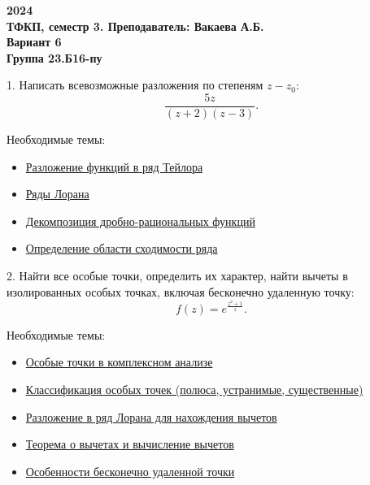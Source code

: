 \documentclass[a4paper,12pt]{article}
\begin{document}
\begin{center}
    \textbf{2024}\\
    \textbf{ТФКП, семестр 3. Преподаватель: Вакаева А.Б.}\\
    \vspace{1cm}
    \textbf{Вариант 6}\\
    \textbf{Группа 23.Б16-пу}
\end{center}

\vspace{1cm}

1. Написать всевозможные разложения по степеням $z - z_0$:
\begin{equation*}
    \frac{5z}{(z+2)(z-3)}.
\end{equation*}

Необходимые темы:
\begin{itemize}
    \item \href{https://ru.wikipedia.org/wiki/Ряд_Тейлора}{Разложение функций в ряд Тейлора}
    \item \href{https://ru.wikipedia.org/wiki/Ряд_Лорана}{Ряды Лорана}
    \item \href{https://ru.wikipedia.org/wiki/Дробно-рациональная_функция}{Декомпозиция 
    дробно-рациональных функций}
    \item \href{https://ru.wikipedia.org/wiki/Область_сходимости}{Определение области 
    сходимости ряда}
\end{itemize}

\vspace{0.5cm}

2. Найти все особые точки, определить их характер, найти вычеты в изолированных 
особых точках, включая бесконечно удаленную точку:
\begin{equation*}
    f(z) = e^{\frac{z^2+1}{z}}.
\end{equation*}

Необходимые темы:
\begin{itemize}
    \item \href{https://ru.wikipedia.org/wiki/Особая_точка}{Особые точки в комплексном 
    анализе}
    \item \href{https://ru.wikipedia.org/wiki/Классификация_особых_точек}{Классификация 
    особых точек (полюса, устранимые, существенные)}
    \item \href{https://ru.wikipedia.org/wiki/Ряд_Лорана}{Разложение в ряд Лорана для 
    нахождения вычетов}
    \item \href{https://ru.wikipedia.org/wiki/Вычет}{Теорема о вычетах и вычисление 
    вычетов}
    \item \href{https://ru.wikipedia.org/wiki/Бесконечно_удаленная_точка}{Особенности 
    бесконечно удаленной точки}
\end{itemize}
\end{document}

